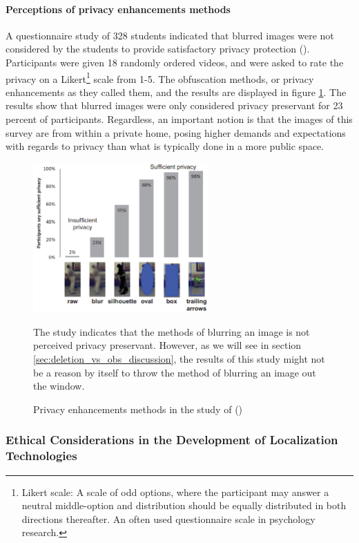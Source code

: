 \paragraph{Perceptions of privacy enhancements methods}
A questionnaire study of 328 students indicated that blurred images were not considered by the students to provide satisfactory privacy protection (\cite{ed2012privacy_review}). Participants were given 18 randomly ordered videos, and were asked to rate the privacy on a Likert\footnote{Likert scale: A scale of odd options, where the participant may answer a neutral middle-option and distribution should be equally distributed in both directions thereafter. An often used questionnaire scale in psychology research.} scale from 1-5. The obfuscation methods, or privacy enhancements as they called them, and the results are displayed in figure \ref{fig:ed_results}. The results show that blurred images were only considered privacy preservant for 23 percent of participants. Regardless, an important notion is that the images of this survey are from within a private home, posing higher demands and expectations with regards to privacy than what is typically done in a more public space.

\begin{figure}[H]
    \centering
    \includegraphics[width=0.6\textwidth]{Images/ed2012results.png}
    \caption{Privacy enhancements methods in the study of  \citeauthor{ed2012privacy_review} (\citeyear{ed2012privacy_review})}
    \RaggedRight The study indicates that the methods of blurring an image is not perceived privacy preservant. However, as we will see in section \ref{sec:deletion_vs_obs_discussion}, the results of this study might not be a reason by itself to throw the method of blurring an image out the window.
    \label{fig:ed_results}
\end{figure}

\subsubsection{Ethical Considerations in the Development of Localization Technologies}
\label{sec:ethics_localization_tech}

